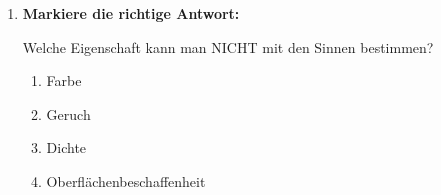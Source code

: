 \begin{enumerate}[label=\arabic*.]
    \vspace{1cm}

    \item \textbf{Markiere die richtige Antwort:}
    \vspace{0.5cm}

    Welche Eigenschaft kann man NICHT mit den Sinnen bestimmen?
    \begin{enumerate}[label=(\alph*)]
        \item Farbe
        \item Geruch
        \item Dichte
        \item Oberflächenbeschaffenheit
    \end{enumerate}

\end{enumerate}
